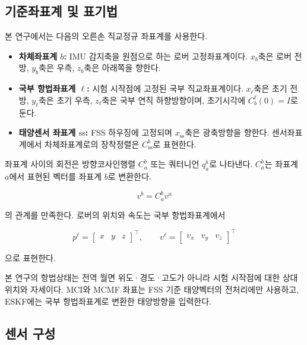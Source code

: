 \documentclass[]{IAC_style}
\begin{document}
\subsection{기준좌표계 및 표기법}

본 연구에서는 다음의 오른손 직교정규 좌표계를 사용한다.

\begin{itemize}[leftmargin=*]

\item \textbf{차체좌표계 $b$:} IMU 감지축을 원점으로 하는 로버 고정좌표계이다. $x_b$축은 로버 전방, $y_b$축은 우측, $z_b$축은 아래쪽을 향한다.

\item \textbf{국부 항법좌표계 $\ell$:} 시험 시작점에 고정된 국부 직교좌표계이다. $x_\ell$축은 초기 전방, $y_\ell$축은 초기 우측, $z_\ell$축은 국부 연직 하향방향이며, 초기시각에 $C_b^\ell(0)=I$로 둔다.

\item \textbf{태양센서 좌표계 $\mathrm{ss}$:} FSS 하우징에 고정되며 $x_{\mathrm{ss}}$축은 광축방향을 향한다. 센서좌표계에서 차체좌표계로의 장착정렬은 $C_{\mathrm{ss}}^b$로 표현한다.

\end{itemize}

좌표계 사이의 회전은 방향코사인행렬 $C_a^b$ 또는 쿼터니언 $q_a^b$로 나타낸다. $C_a^b$는 좌표계 $a$에서 표현된 벡터를 좌표계 $b$로 변환한다.

\begin{equation*}
v^b=C_a^b v^a
\end{equation*}

의 관계를 만족한다. 로버의 위치와 속도는 국부 항법좌표계에서

\begin{equation*}
p^\ell=\begin{bmatrix}x&y&z\end{bmatrix}^{\top},\qquad v^\ell=\begin{bmatrix}v_x&v_y&v_z\end{bmatrix}^{\top}
\end{equation*}

으로 표현한다.

본 연구의 항법상태는 전역 월면 위도·경도·고도가 아니라 시험 시작점에 대한 상대 위치와 자세이다. MCI와 MCMF 좌표는 FSS 기준 태양벡터의 전처리에만 사용하고, ESKF에는 국부 항법좌표계로 변환한 태양방향을 입력한다.

\subsection{센서 구성}
\end{document}
